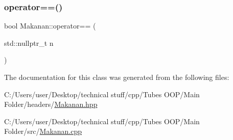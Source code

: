 \mbox{\label{class_makanan_ac256031452bfaebf4b975793bcf6b318}} 
\subsubsection{\texorpdfstring{operator==()}{operator==()}\hspace{0.1cm}{\footnotesize\ttfamily [2/2]}}
{\footnotesize\ttfamily bool Makanan\+::operator== (\begin{DoxyParamCaption}\item[{std\+::nullptr\+\_\+t}]{n }\end{DoxyParamCaption})}



The documentation for this class was generated from the following files\+:\begin{DoxyCompactItemize}
\item 
C\+:/\+Users/user/\+Desktop/technical stuff/cpp/\+Tubes O\+O\+P/\+Main Folder/headers/\mbox{\hyperlink{_makanan_8hpp}{Makanan.\+hpp}}\item 
C\+:/\+Users/user/\+Desktop/technical stuff/cpp/\+Tubes O\+O\+P/\+Main Folder/src/\mbox{\hyperlink{_makanan_8cpp}{Makanan.\+cpp}}\end{DoxyCompactItemize}
